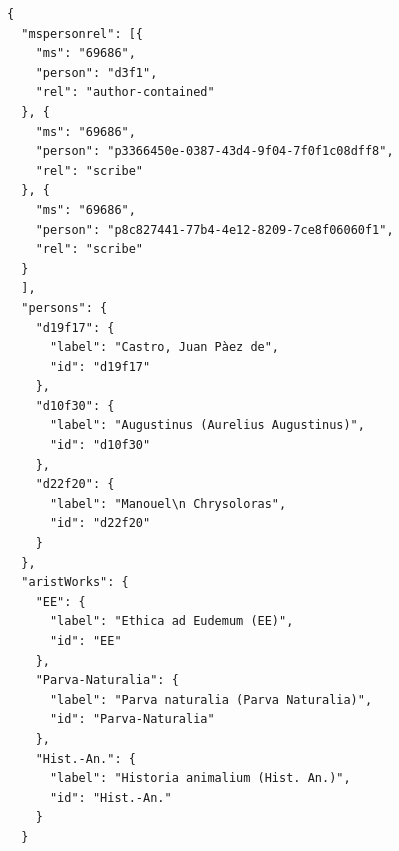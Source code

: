 \documentclass[12pt,ngerman,]{article}
\begin{document}
\begin{verbatim}
{
  "mspersonrel": [{
    "ms": "69686",
    "person": "d3f1",
    "rel": "author-contained"
  }, {
    "ms": "69686",
    "person": "p3366450e-0387-43d4-9f04-7f0f1c08dff8",
    "rel": "scribe"
  }, {
    "ms": "69686",
    "person": "p8c827441-77b4-4e12-8209-7ce8f06060f1",
    "rel": "scribe"
  }
  ],
  "persons": {
    "d19f17": {
      "label": "Castro, Juan Pàez de",
      "id": "d19f17"
    },
    "d10f30": {
      "label": "Augustinus (Aurelius Augustinus)",
      "id": "d10f30"
    },
    "d22f20": {
      "label": "Manouel\n Chrysoloras",
      "id": "d22f20"
    }
  },
  "aristWorks": {
    "EE": {
      "label": "Ethica ad Eudemum (EE)",
      "id": "EE"
    },
    "Parva-Naturalia": {
      "label": "Parva naturalia (Parva Naturalia)",
      "id": "Parva-Naturalia"
    },
    "Hist.-An.": {
      "label": "Historia animalium (Hist. An.)",
      "id": "Hist.-An."
    }
  }
\end{verbatim}
\end{document}
